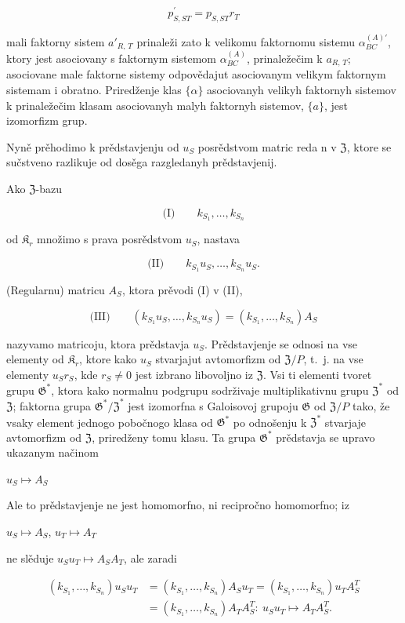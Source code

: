\documentclass[11pt]{article}
\begin{document}
\[p_{S,ST}^{\prime}=p_{S,ST}r_{T}\]

mali faktorny sistem \(a'_{R,\,T}\) prinaleži zato k velikomu faktornomu sistemu \(\alpha^{(A)\prime}_{BC}\), ktory jest asociovany s faktornym sistemom \(\alpha^{(A)}_{BC}\), prinaležečim k \(a_{R,\,T}\); asociovane male faktorne sistemy odpovědajut asociovanym velikym faktornym sistemam i obratno. Priredženje klas \(\{\alpha\}\) asociovanyh velikyh faktornyh sistemov k prinaležečim klasam asociovanyh malyh faktornyh sistemov, \(\{a\}\), jest izomorfizm grup.

Nyně prěhodimo k prědstavjenju od \(u_S\) posrědstvom matric reda n v \(\mathfrak{Z}\), ktore se sučstveno razlikuje od dosěga razgledanyh prědstavjenij.

Ako \(\mathfrak Z\)-bazu

\[
\text{(I)}\qquad k_{S_1}, \ldots, k_{S_n}
\]

od \(\mathfrak K_r\) množimo s prava posrědstvom \(u_S\), nastava

\[
\text{(II)}\qquad k_{S_1}u_S, \ldots, k_{S_n}u_S.
\]

(Regularnu) matricu \(A_S\), ktora prěvodi (I) v (II),

\[
\text{(III)}\qquad (k_{S_1}u_S, \ldots, k_{S_n}u_S) = (k_{S_1}, \ldots, k_{S_n})A_S
\]

nazyvamo matricoju, ktora prědstavja \(u_S\). Prědstavjenje se odnosi na vse elementy od \(\mathfrak K_{r}\), ktore kako \(u_S\) stvarjajut avtomorfizm od \(\mathfrak Z/P\), t.~j. na vse elementy \(u_Sr_S\), kde \(r_S \neq 0\) jest izbrano libovoljno iz \(\mathfrak Z\). Vsi ti elementi tvoret grupu \(\mathfrak G^*\), ktora kako normalnu podgrupu sodrživaje multiplikativnu grupu \(\mathfrak Z^*\) od \(\mathfrak Z\); faktorna grupa \(\mathfrak G^*/\mathfrak Z^*\) jest izomorfna s Galoisovoj grupoju \(\mathfrak G\) od \(\mathfrak Z/P\) tako, že vsaky element jednogo pobočnogo klasa od \(\mathfrak G^*\) po odnošenju k \(\mathfrak Z^*\) stvarjaje avtomorfizm od \(\mathfrak Z\), priredženy tomu klasu. Ta grupa \(\mathfrak G^*\) prědstavja se upravo ukazanym načinom

\(u_S \mapsto A_S\)

Ale to prědstavjenje ne jest homomorfno, ni recipročno homomorfno; iz

\(u_S \mapsto A_S\), \(u_T \mapsto A_T\)

ne slěduje \(u_Su_T \mapsto A_SA_T\), ale zaradi

\[
\begin{aligned}
(k_{S_1}, \ldots, k_{S_n})u_Su_T
&=(k_{S_1}, \ldots, k_{S_n})A_Su_T
=(k_{S_1}, \ldots, k_{S_n})u_TA_S^T\\
&=(k_{S_1}, \ldots, k_{S_n})A_TA_S^T:\ u_Su_T\mapsto A_TA_S^T.
\end{aligned}
\]
\end{document}
